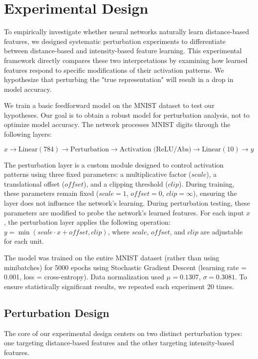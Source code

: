 \section{Experimental Design}

To empirically investigate whether neural networks naturally learn distance-based features, we designed systematic perturbation experiments to differentiate between distance-based and intensity-based feature learning. This experimental framework directly compares these two interpretations by examining how learned features respond to specific modifications of their activation patterns. We hypothesize that perturbing the "true representation" will result in a drop in model accuracy. 

We train a basic feedforward model on the MNIST dataset to test our hypotheses. Our goal is to obtain a robust model for perturbation analysis, not to optimize model accuracy. The network processes MNIST digits through the following layers:

\begin{equation}
    x \rightarrow \text{Linear}(784) \rightarrow \text{Perturbation} \rightarrow \text{Activation (ReLU/Abs)} \rightarrow \text{Linear}(10) \rightarrow y
\end{equation}
 
The perturbation layer is a custom module designed to control activation patterns using three fixed parameters: a multiplicative factor ($scale$), a translational offset ($offset$), and a clipping threshold ($clip$). During training, these parameters remain fixed ($scale = 1$, $offset = 0$, $clip = \infty$), ensuring the layer does not influence the network's learning. During perturbation testing, these parameters are modified to probe the network's learned features. For each input $x$, the perturbation layer applies the following operation: $y = \min(scale \cdot x + offset, clip)$, where $scale$, $offset$, and $clip$ are adjustable for each unit.

The model was trained on the entire MNIST dataset (rather than using minibatches) for 5000 epochs using Stochastic Gradient Descent (learning rate = 0.001, loss = cross-entropy). Data normalization used $\mu=0.1307$, $\sigma=0.3081$. To ensure statistically significant results, we repeated each experiment 20 times.
\subsection{Perturbation Design}

The core of our experimental design centers on two distinct perturbation types: one targeting distance-based features and the other targeting intensity-based features.

